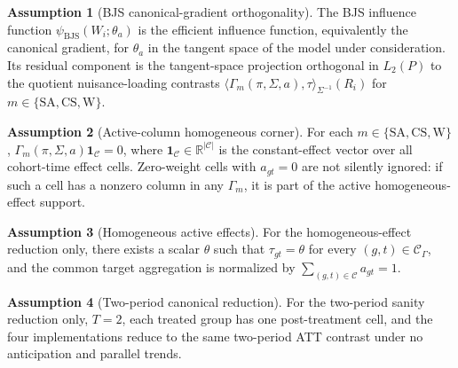 \documentclass[11pt]{article}
\newcommand{\R}{\mathbb{R}}
\theoremstyle{definition}
\newtheorem{assumption}{Assumption}
\theoremstyle{plain}
\theoremstyle{remark}
\begin{document}
\begin{assumption}[BJS canonical-gradient orthogonality]\label{ass:bjs-orthogonality}
The BJS influence function \(\psi_{\mathrm{BJS}}(W_i;\theta_a)\) is the efficient influence
function, equivalently the canonical gradient, for \(\theta_a\) in the tangent space of the model
under consideration.  Its residual component is the tangent-space projection orthogonal in \(L_2(P)\)
to the quotient nuisance-loading contrasts
\(\langle \Gamma_m(\pi,\Sigma,a),\tau\rangle_{\Sigma^{-1}}(R_i)\) for
\(m\in\{\mathrm{SA},\mathrm{CS},\mathrm{W}\}\).
\end{assumption}

\begin{assumption}[Active-column homogeneous corner]\label{ass:active-column-homogeneous}
For each \(m\in\{\mathrm{SA},\mathrm{CS},\mathrm{W}\}\),
\(\Gamma_m(\pi,\Sigma,a)\mathbf 1_{\mathcal C}=0\), where
\(\mathbf 1_{\mathcal C}\in\R^{|\mathcal C|}\) is the constant-effect vector over all cohort-time
effect cells.  Zero-weight cells with \(a_{gt}=0\) are not silently ignored: if such a cell has a
nonzero column in any \(\Gamma_m\), it is part of the active homogeneous-effect support.
\end{assumption}

\begin{assumption}[Homogeneous active effects]\label{ass:homogeneous-active-effects}
For the homogeneous-effect reduction only, there exists a scalar \(\theta\) such that
\(\tau_{gt}=\theta\) for every \((g,t)\in\mathcal C_\Gamma\), and the common target aggregation is
normalized by \(\sum_{(g,t)\in\mathcal C}a_{gt}=1\).
\end{assumption}

\begin{assumption}[Two-period canonical reduction]\label{ass:two-period-canonical}
For the two-period sanity reduction only, \(T=2\), each treated group has one post-treatment cell,
and the four implementations reduce to the same two-period ATT contrast under no anticipation and
parallel trends.
\end{assumption}
\end{document}
